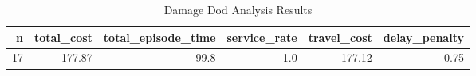 \begin{table}
\centering
\caption{Damage Dod Analysis Results}
\begin{tabular}{rrrrrr}
\toprule
 n &  total\_cost &  total\_episode\_time &  service\_rate &  travel\_cost &  delay\_penalty \\
\midrule
17 &      177.87 &                99.8 &           1.0 &       177.12 &           0.75 \\
\bottomrule
\end{tabular}
\end{table}
